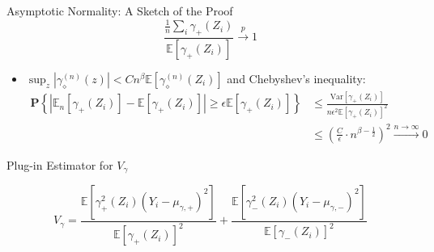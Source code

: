  \begin{frame}{Asymptotic Normality: A Sketch of the Proof}
    $$
    \frac{\frac{1}{n}\sum_{i}\gamma_{+}\left(Z_{i}\right)}{\mathbb{E}\left[\gamma_{+}\left(Z_{i}\right)\right]} \xrightarrow{p} 1
    $$

    \begin{itemize}
        \item \textcolor{mygreen}{$\boxed{\sup_{z}\left|\gamma_{\diamond}^{\left(n\right)}\left(z\right)\right|<Cn^{\beta}  \mathbb{E} \left[\gamma_{\diamond}^{\left(n\right)}\left(Z_{i}\right)\right]}$} and \textcolor{mygreen}{Chebyshev's inequality}:
        \begin{align*}
            \mathbf{P}\left\{ \left|\mathbb{E}_{n}\left[\gamma_{+}\left(Z_{i}\right)\right]-\mathbb{E}\left[\gamma_{+}\left(Z_{i}\right)\right]\right|\geq\epsilon\mathbb{E}\left[\gamma_{+}\left(Z_{i}\right)\right]\right\} &\leq\frac{\mathrm{Var}\left[\gamma_{+}\left(Z_{i}\right)\right]}{n\epsilon^{2}\mathbb{E}\left[\gamma_{+}\left(Z_{i}\right)\right]^{2}} \\ 
            & \leq \left(\frac{C}{\epsilon}\cdot n^{\beta-\frac{1}{2}}\right)^{2}\xrightarrow{n\rightarrow\infty}0
        \end{align*}
    \end{itemize}
 \end{frame}

 \begin{frame}{Plug-in Estimator for $V_{\gamma}$}

    $$
    V_{\gamma}=\frac{\mathbb{E}\left[\gamma_{+}^{2}\left(Z_{i}\right)\left(Y_{i}-\mu_{\gamma,+}\right)^{2}\right]}{\mathbb{E}\left[\gamma_{+}\left(Z_{i}\right)\right]^{2}}+\frac{\mathbb{E}\left[\gamma_{-}^{2}\left(Z_{i}\right)\left(Y_{i}-\mu_{\gamma,-}\right)^{2}\right]}{\mathbb{E}\left[\gamma_{-}\left(Z_{i}\right)\right]^{2}}
    $$
 \end{frame}

